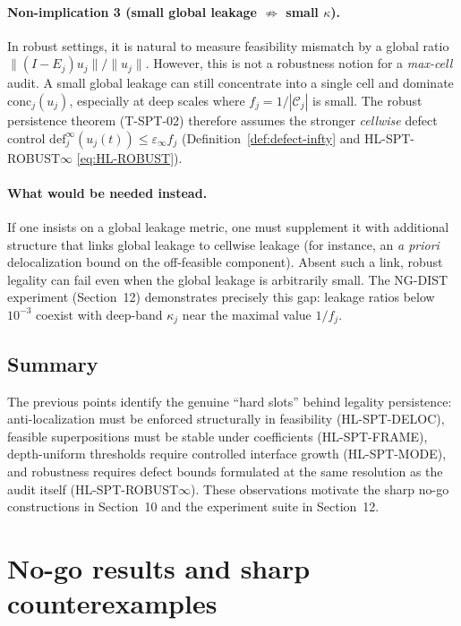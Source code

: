 \documentclass[11pt]{article}
\begin{document}
\paragraph{Non-implication 3 (small global leakage $\not\Rightarrow$ small $\kappa$).}
In robust settings, it is natural to measure feasibility mismatch by a global ratio
$\|(I-E_j)u_j\|/\|u_j\|$.
However, this is not a robustness notion for a \emph{max-cell} audit.
A small global leakage can still concentrate into a single cell and dominate $\mathrm{conc}_j(u_j)$, especially at deep scales where $f_j=1/|\mathcal{C}_j|$ is small.
The robust persistence theorem (T-SPT-02) therefore assumes the stronger \emph{cellwise} defect control
$\mathrm{def}^{\infty}_j(u_j(t))\le \varepsilon_\infty f_j$ (Definition~\ref{def:defect-infty} and HL-SPT-ROBUST$\infty$ \eqref{eq:HL-ROBUST}).

\paragraph{What would be needed instead.}
If one insists on a global leakage metric, one must supplement it with additional structure that links global leakage to cellwise leakage (for instance, an \emph{a priori} delocalization bound on the off-feasible component).
Absent such a link, robust legality can fail even when the global leakage is arbitrarily small.
The NG-DIST experiment (Section~12) demonstrates precisely this gap: leakage ratios below $10^{-3}$ coexist with deep-band $\kappa_j$ near the maximal value $1/f_j$.

\subsection{Summary}

The previous points identify the genuine ``hard slots'' behind legality persistence:
anti-localization must be enforced structurally in feasibility (HL-SPT-DELOC), feasible superpositions must be stable under coefficients (HL-SPT-FRAME), depth-uniform thresholds require controlled interface growth (HL-SPT-MODE), and robustness requires defect bounds formulated at the same resolution as the audit itself (HL-SPT-ROBUST$\infty$).
These observations motivate the sharp no-go constructions in Section~10 and the experiment suite in Section~12.
 \section{No-go results and sharp counterexamples}\label{sec:nogo}
\end{document}
